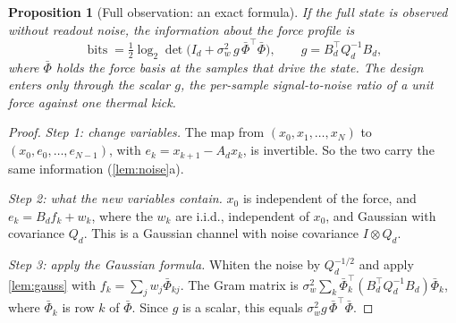 \documentclass[11pt]{article}
\newtheorem{proposition}[theorem]{Proposition}
\theoremstyle{definition}
\theoremstyle{remark}
\newcommand{\bits}{\operatorname{bits}}
\begin{document}
\begin{proposition}[Full observation: an exact formula]\label{prop:innov}
If the full state is observed without readout noise, the information about the force
profile is
\[
  \bits=\tfrac12\log_2\det\!\big(I_d+\sigma_w^2\,g\,\bar\Phi^\top\bar\Phi\big),
  \qquad g=B_d^\top Q_d^{-1}B_d ,
\]
where $\bar\Phi$ holds the force basis at the samples that drive the state. The design
enters only through the scalar $g$, the per-sample signal-to-noise ratio of a unit force
against one thermal kick.
\end{proposition}
\begin{proof}
\emph{Step 1: change variables.} The map from $(x_0,x_1,\dots,x_N)$ to
$(x_0,e_0,\dots,e_{N-1})$, with $e_k=x_{k+1}-A_dx_k$, is invertible. So the two carry the
same information (\cref{lem:noise}a).

\emph{Step 2: what the new variables contain.} $x_0$ is independent of the force, and
$e_k=B_df_k+w_k$, where the $w_k$ are i.i.d., independent of $x_0$, and Gaussian with
covariance $Q_d$. This is a Gaussian channel with noise covariance $I\otimes Q_d$.

\emph{Step 3: apply the Gaussian formula.} Whiten the noise by $Q_d^{-1/2}$ and apply
\cref{lem:gauss} with $f_k=\sum_jw_j\bar\Phi_{kj}$. The Gram matrix is
$\sigma_w^2\sum_k\bar\Phi_k^\top(B_d^\top Q_d^{-1}B_d)\bar\Phi_k$, where $\bar\Phi_k$ is
row $k$ of $\bar\Phi$. Since $g$ is a scalar, this equals $\sigma_w^2g\,\bar\Phi^\top\bar\Phi$.
\end{proof}
\end{document}
